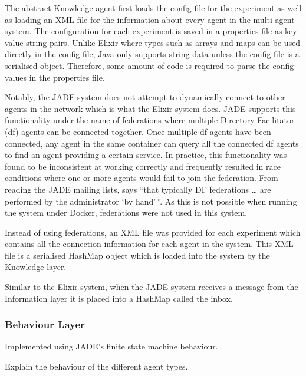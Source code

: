 The abstract Knowledge agent first loads the config file for the experiment as well as loading an XML file for the information about every agent in the multi-agent system.
The configuration for each experiment is saved in a properties file as key-value string pairs.
Unlike Elixir where types such as arrays and maps can be used directly in the config file, Java only supports string data unless the config file is a serialised object.
Therefore, some amount of code is required to parse the config values in the properties file.

Notably, the JADE system does not attempt to dynamically connect to other agents in the network which is what the Elixir system does.
JADE supports this functionality under the name of federations where multiple Directory Facilitator (df) agents can be connected together.
Once multiple df agents have been connected, any agent in the same container can query all the connected df agents to find an agent providing a certain service.
In practice, this functionality was found to be inconsistent at working correctly and frequently resulted in race conditions where one or more agents would fail to join the federation.
From reading the JADE mailing lists,  says ``that typically DF federations \dots{} are performed by the administrator `by hand'\,''.
As this is not possible when running the system under Docker, federations were not used in this system.

Instead of using federations, an XML file was provided for each experiment which contains all the connection information for each agent in the system.
This XML file is a serialised HashMap object which is loaded into the system by the Knowledge layer.

Similar to the Elixir system, when the JADE system receives a message from the Information layer it is placed into a HashMap called the inbox.

\subsubsection{Behaviour Layer}

Implemented using JADE's finite state machine behaviour.

Explain the behaviour of the different agent types.
